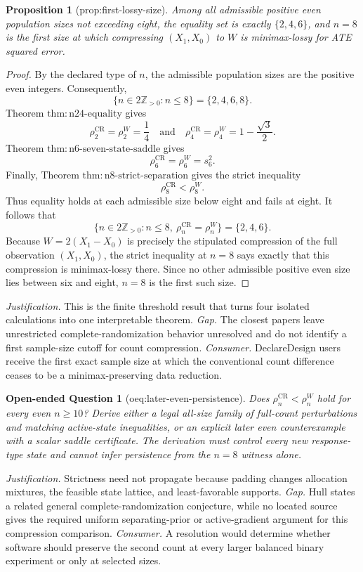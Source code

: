 \documentclass{article}
\newtheorem{proposition}{Proposition}
\newtheorem{openendedquestion}{Open-ended Question}
\begin{document}
\begin{proposition}[prop:first-lossy-size]\label{prop:first-lossy-size}
Among all admissible positive even population sizes not exceeding eight, the equality set is exactly \(\{2,4,6\}\), and \(n=8\) is the first size at which compressing \((X_1,X_0)\) to \(W\) is minimax-lossy for ATE squared error.
\end{proposition}
\begin{proof}
By the declared type of \(n\), the admissible population sizes are the positive even integers.  Consequently,
\[
 \{n\in 2\mathbb Z_{>0}:n\leq 8\}=\{2,4,6,8\}.
\]
Theorem \(\mathrm{thm{:}n24\mbox{-}equality}\) gives
\[
 \rho_2^{\mathrm{CR}}=\rho_2^W=\frac14
 \quad\text{and}\quad
 \rho_4^{\mathrm{CR}}=\rho_4^W=1-\frac{\sqrt3}{2}.
\]
Theorem \(\mathrm{thm{:}n6\mbox{-}seven\mbox{-}state\mbox{-}saddle}\) gives
\[
 \rho_6^{\mathrm{CR}}=\rho_6^W=s_6^2.
\]
Finally, Theorem \(\mathrm{thm{:}n8\mbox{-}strict\mbox{-}separation}\) gives the strict inequality
\[
 \rho_8^{\mathrm{CR}}<\rho_8^W.
\]
Thus equality holds at each admissible size below eight and fails at eight.  It follows that
\[
 \{n\in 2\mathbb Z_{>0}:n\leq8,\ \rho_n^{\mathrm{CR}}=\rho_n^W\}
 =\{2,4,6\}.
\]
Because \(W=2(X_1-X_0)\) is precisely the stipulated compression of the full observation \((X_1,X_0)\), the strict inequality at \(n=8\) says exactly that this compression is minimax-lossy there.  Since no other admissible positive even size lies between six and eight, \(n=8\) is the first such size.
\end{proof}
\par\smallskip\noindent \textit{Justification.} This is the finite threshold result that turns four isolated calculations into one interpretable theorem. \textit{Gap.} The closest papers leave unrestricted complete-randomization behavior unresolved and do not identify a first sample-size cutoff for count compression. \textit{Consumer.} DeclareDesign users receive the first exact sample size at which the conventional count difference ceases to be a minimax-preserving data reduction.

\begin{openendedquestion}[oeq:later-even-persistence]\label{oeq:later-even-persistence}
Does \(\rho_n^{\mathrm{CR}}<\rho_n^W\) hold for every even \(n\ge10\)? Derive either a legal all-size family of full-count perturbations and matching active-state inequalities, or an explicit later even counterexample with a scalar saddle certificate. The derivation must control every new response-type state and cannot infer persistence from the \(n=8\) witness alone.
\end{openendedquestion}
\par\smallskip\noindent \textit{Justification.} Strictness need not propagate because padding changes allocation mixtures, the feasible state lattice, and least-favorable supports. \textit{Gap.} Hull states a related general complete-randomization conjecture, while no located source gives the required uniform separating-prior or active-gradient argument for this compression comparison. \textit{Consumer.} A resolution would determine whether software should preserve the second count at every larger balanced binary experiment or only at selected sizes.
\end{document}
